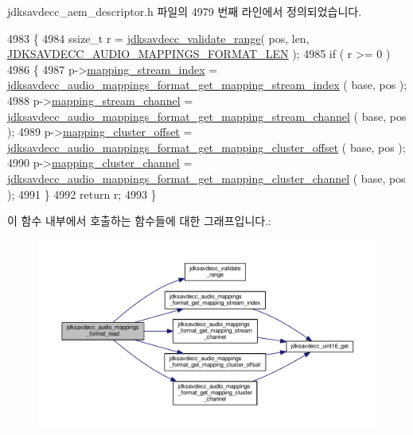 jdksavdecc\+\_\+aem\+\_\+descriptor.\+h 파일의 4979 번째 라인에서 정의되었습니다.


\begin{DoxyCode}
4983 \{
4984     ssize\_t r = \hyperlink{group__util_ga9c02bdfe76c69163647c3196db7a73a1}{jdksavdecc\_validate\_range}( pos, len, 
      \hyperlink{group__audio__mappings__format_ga27e53ab74d41b53c675374da298eafc5}{JDKSAVDECC\_AUDIO\_MAPPINGS\_FORMAT\_LEN} );
4985     \textcolor{keywordflow}{if} ( r >= 0 )
4986     \{
4987         p->\hyperlink{structjdksavdecc__audio__mappings__format_ae776f05f1f60f83a69c154844271ca4a}{mapping\_stream\_index} = 
      \hyperlink{group__audio__mappings__format_gaf0e2e1d6206477cd3cb45f27c25f024f}{jdksavdecc\_audio\_mappings\_format\_get\_mapping\_stream\_index}
      ( base, pos );
4988         p->\hyperlink{structjdksavdecc__audio__mappings__format_a82e8b562c8e2249f302ed80fc1debadf}{mapping\_stream\_channel} = 
      \hyperlink{group__audio__mappings__format_ga0e2304b6d2ebee2269eb0d583d738181}{jdksavdecc\_audio\_mappings\_format\_get\_mapping\_stream\_channel}
      ( base, pos );
4989         p->\hyperlink{structjdksavdecc__audio__mappings__format_ab57e85d38dacb8e4e841cf9f1fbd7a36}{mapping\_cluster\_offset} = 
      \hyperlink{group__audio__mappings__format_ga66321dd06b3768bc30d0f94eeeb60e78}{jdksavdecc\_audio\_mappings\_format\_get\_mapping\_cluster\_offset}
      ( base, pos );
4990         p->\hyperlink{structjdksavdecc__audio__mappings__format_af42f86d0c0e308d654bb9519455c7e26}{mapping\_cluster\_channel} = 
      \hyperlink{group__audio__mappings__format_ga3b0b8e360debc1d76376fb2e045eea60}{jdksavdecc\_audio\_mappings\_format\_get\_mapping\_cluster\_channel}
      ( base, pos );
4991     \}
4992     \textcolor{keywordflow}{return} r;
4993 \}
\end{DoxyCode}


이 함수 내부에서 호출하는 함수들에 대한 그래프입니다.\+:
\nopagebreak
\begin{figure}[H]
\begin{center}
\leavevmode
\includegraphics[width=350pt]{group__audio__mappings__format_ga8f5dee42add7aad85ccfbf23de25014f_cgraph}
\end{center}
\end{figure}



